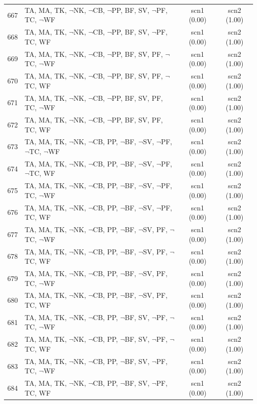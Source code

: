 \documentclass[12pt]{article}
\begin{document}
\begin{longtable}{|l|l|c|c|}
667 & TA, MA, TK, $\neg$NK, $\neg$CB, $\neg$PP, BF, SV, $\neg$PF, TC, $\neg$WF & scn1 (0.00) & scn2 (1.00)\\
668 & TA, MA, TK, $\neg$NK, $\neg$CB, $\neg$PP, BF, SV, $\neg$PF, TC, WF & scn1 (0.00) & scn2 (1.00)\\
669 & TA, MA, TK, $\neg$NK, $\neg$CB, $\neg$PP, BF, SV, PF, $\neg$TC, $\neg$WF & scn1 (0.00) & scn2 (1.00)\\
670 & TA, MA, TK, $\neg$NK, $\neg$CB, $\neg$PP, BF, SV, PF, $\neg$TC, WF & scn1 (0.00) & scn2 (1.00)\\
671 & TA, MA, TK, $\neg$NK, $\neg$CB, $\neg$PP, BF, SV, PF, TC, $\neg$WF & scn1 (0.00) & scn2 (1.00)\\
672 & TA, MA, TK, $\neg$NK, $\neg$CB, $\neg$PP, BF, SV, PF, TC, WF & scn1 (0.00) & scn2 (1.00)\\
673 & TA, MA, TK, $\neg$NK, $\neg$CB, PP, $\neg$BF, $\neg$SV, $\neg$PF, $\neg$TC, $\neg$WF & scn1 (0.00) & scn2 (1.00)\\
674 & TA, MA, TK, $\neg$NK, $\neg$CB, PP, $\neg$BF, $\neg$SV, $\neg$PF, $\neg$TC, WF & scn1 (0.00) & scn2 (1.00)\\
675 & TA, MA, TK, $\neg$NK, $\neg$CB, PP, $\neg$BF, $\neg$SV, $\neg$PF, TC, $\neg$WF & scn1 (0.00) & scn2 (1.00)\\
676 & TA, MA, TK, $\neg$NK, $\neg$CB, PP, $\neg$BF, $\neg$SV, $\neg$PF, TC, WF & scn1 (0.00) & scn2 (1.00)\\
677 & TA, MA, TK, $\neg$NK, $\neg$CB, PP, $\neg$BF, $\neg$SV, PF, $\neg$TC, $\neg$WF & scn1 (0.00) & scn2 (1.00)\\
678 & TA, MA, TK, $\neg$NK, $\neg$CB, PP, $\neg$BF, $\neg$SV, PF, $\neg$TC, WF & scn1 (0.00) & scn2 (1.00)\\
679 & TA, MA, TK, $\neg$NK, $\neg$CB, PP, $\neg$BF, $\neg$SV, PF, TC, $\neg$WF & scn1 (0.00) & scn2 (1.00)\\
680 & TA, MA, TK, $\neg$NK, $\neg$CB, PP, $\neg$BF, $\neg$SV, PF, TC, WF & scn1 (0.00) & scn2 (1.00)\\
681 & TA, MA, TK, $\neg$NK, $\neg$CB, PP, $\neg$BF, SV, $\neg$PF, $\neg$TC, $\neg$WF & scn1 (0.00) & scn2 (1.00)\\
682 & TA, MA, TK, $\neg$NK, $\neg$CB, PP, $\neg$BF, SV, $\neg$PF, $\neg$TC, WF & scn1 (0.00) & scn2 (1.00)\\
683 & TA, MA, TK, $\neg$NK, $\neg$CB, PP, $\neg$BF, SV, $\neg$PF, TC, $\neg$WF & scn1 (0.00) & scn2 (1.00)\\
684 & TA, MA, TK, $\neg$NK, $\neg$CB, PP, $\neg$BF, SV, $\neg$PF, TC, WF & scn1 (0.00) & scn2 (1.00)\\

\end{longtable}
\end{document}
